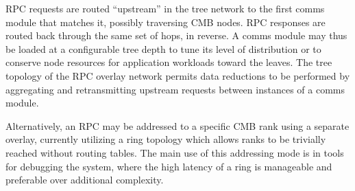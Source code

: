 RPC requests are routed ``upstream'' in the tree network to the first comms module that matches
it, possibly traversing CMB nodes.  RPC responses are routed back through
the same set of hops, in reverse.  A comms module may thus be loaded
at a configurable tree depth to tune its level of distribution
or to conserve node resources for application workloads toward the leaves.
The tree topology of the RPC overlay network permits data reductions to be performed by
aggregating and retransmitting upstream requests between instances of
a comms module.

Alternatively, an RPC may be addressed to a specific CMB rank using a
separate overlay, currently utilizing a ring topology which allows
ranks to be trivially reached without routing tables.  The main use
of this addressing mode is in tools for debugging the system,
where the high latency of a ring is manageable and preferable over additional complexity.

%
